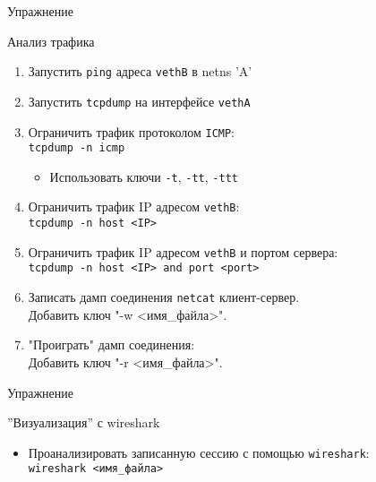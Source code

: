 \begin{frame}[fragile]{Упражнение}
    \begin{block}{Анализ трафика}
        \begin{enumerate}
            \item Запустить {\tt ping} адреса {\tt vethB} в netns 'A'
            \item Запустить {\tt tcpdump} на интерфейсе {\tt vethA}
            \item Ограничить трафик протоколом {\tt ICMP}:\\
                {\tt tcpdump -n icmp}
                \begin{itemize}
                    \item Использовать ключи {\tt -t}, {\tt -tt}, {\tt -ttt}
                \end{itemize}
            \item Ограничить трафик IP адресом {\tt vethB}:\\
                {\tt tcpdump -n host <IP>}
            \item Ограничить трафик IP адресом {\tt vethB} и портом сервера:\\
                {\tt tcpdump -n host <IP> and port <port>}
            \item Записать дамп соединения {\tt netcat} клиент-сервер.\\
                Добавить ключ "-w <имя\_файла>".
            \item "Проиграть" дамп соединения:\\
                Добавить ключ "-r <имя\_файла>".
        \end{enumerate}
     \end{block}
\end{frame}

\begin{frame}[fragile]{Упражнение}
    \begin{block}{''Визуализация'' с wireshark}
        \begin{itemize}
            \item Проанализировать записанную сессию с помощью {\tt wireshark}:\\
                {\tt wireshark <имя\_файла>}
        \end{itemize}
     \end{block}
\end{frame}

